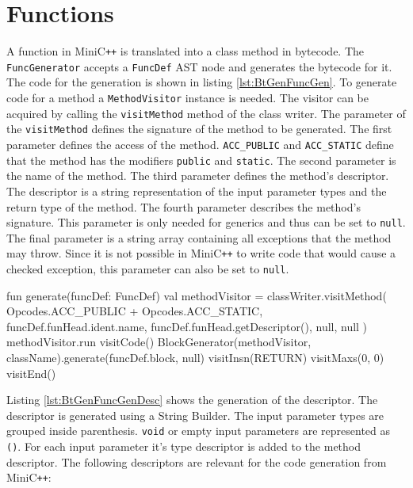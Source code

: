 \section{Functions}

A function in MiniC\verb|++| is translated into a class method in bytecode. The \verb|FuncGenerator| accepts a \verb|FuncDef| AST node and generates the bytecode for it. The code for the generation is shown in listing \ref{lst:BtGenFuncGen}. To generate code for a method a \verb|MethodVisitor| instance is needed. The visitor can be acquired by calling the \verb|visitMethod| method of the class writer. The parameter of the \verb|visitMethod| defines the signature of the method to be generated. The first parameter defines the access of the method. \verb|ACC_PUBLIC| and \verb|ACC_STATIC| define that the method has the modifiers \verb|public| and \verb|static|. The second parameter is the name of the method. The third parameter defines the method's descriptor. The descriptor is a string representation of the input parameter types and the return type of the method. The fourth parameter describes the method's signature. This parameter is only needed for generics and thus can be set to \verb|null|. The final parameter is a string array containing all exceptions that the method may throw. Since  it is not possible in MiniC\verb|++| to write code that would cause a checked exception, this parameter can also be set to \verb|null|. 

\begin{KotlinCode}[float,numbers=none,caption=Code for the bytecode generation of the \texttt{FuncDef} node., label=lst:BtGenFuncGen]
fun generate(funcDef: FuncDef) {
    val methodVisitor = classWriter.visitMethod(
        Opcodes.ACC_PUBLIC + Opcodes.ACC_STATIC,
        funcDef.funHead.ident.name,
        funcDef.funHead.getDescriptor(),
        null,
        null
    )
    methodVisitor.run {
        visitCode()
        BlockGenerator(methodVisitor, className).generate(funcDef.block, null)
        visitInsn(RETURN)
        visitMaxs(0, 0)
        visitEnd()
    }
}
\end{KotlinCode}


Listing \ref{lst:BtGenFuncGenDesc} shows the generation of the descriptor. The descriptor is generated using a String Builder. The input parameter types are grouped inside parenthesis. \verb|void| or empty input parameters are represented as \verb|()|. For each input parameter it's type descriptor is added to the method descriptor. The following descriptors are relevant for the code generation from MiniC\verb|++|:

